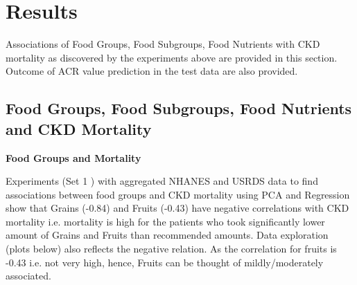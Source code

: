 \section{Results}
Associations of Food Groups, Food Subgroups, Food Nutrients with CKD mortality as discovered by the experiments above are provided in this section. Outcome of ACR value prediction in the test data are also provided.

\subsection{Food Groups, Food Subgroups, Food Nutrients and CKD Mortality}
\noindent \textbf{Food Groups and Mortality}

\noindent Experiments (Set 1 ) with aggregated NHANES and USRDS  data to find associations between food groups and CKD mortality using PCA and Regression show that Grains (-0.84) and Fruits (-0.43) have negative correlations with CKD mortality i.e. mortality is high for the patients who took significantly lower amount of Grains and Fruits than recommended amounts. Data exploration (plots below) also reflects the negative relation. As the correlation for fruits is -0.43 i.e. not very high, hence, Fruits can be thought of mildly/moderately associated.
